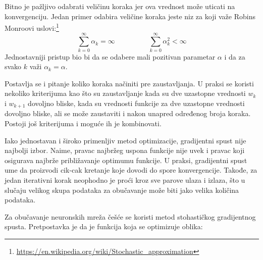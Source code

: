 Bitno je pažljivo odabrati veličinu koraka jer ova vrednost može uticati na konvergenciju. Jedan primer odabira veličine koraka jeste niz za koji važe Robins Monroovi uslovi:\footnote{\url{https://en.wikipedia.org/wiki/Stochastic_approximation}}
\begin{equation}
	 \sum_{k=0}^{\infty} \alpha_k = \infty \hspace{2cm} \sum_{k=0}^{\infty} \alpha_k^2 < \infty 
	\end{equation}
Jednostavniji pristup bio bi da se odabere mali pozitivan parametar $\alpha$ i da za svako $k$ važi $\alpha_k = \alpha$.
\par
Postavlja se i pitanje koliko koraka načiniti pre zaustavljanja. U praksi se koristi nekoliko kriterijuma kao što su zaustavljanje kada su dve uzastopne vrednosti $w_k$ i $w_{k+1}$ dovoljno bliske, kada su vrednosti funkcije za dve uzastopne vrednosti dovoljno bliske, ali se može zaustaviti i nakon unapred određenog broja koraka. Postoji još kriterijuma i moguće ih je kombinovati.
\par
Iako jednostavan i široko primenljiv metod optimizacije, gradijentni spust nije najbolji izbor. Naime, pravac najbržeg uspona funkcije nije uvek i pravac koji osigurava najbrže približavanje optimumu funkcije. U praksi, gradijentni spust ume da proizvodi cik-cak kretanje koje dovodi do spore konvergencije. Takođe, za jedan iterativni korak neophodno je proći kroz sve parove ulaza i izlaza, što u slučaju velikog skupa podataka za obučavanje može biti jako velika količina podataka.
\par
Za obučavanje neuronskih mreža češće se koristi metod stohastičkog gradijentnog spusta. Pretpostavka je da je funkcija koja se optimizuje oblika:

